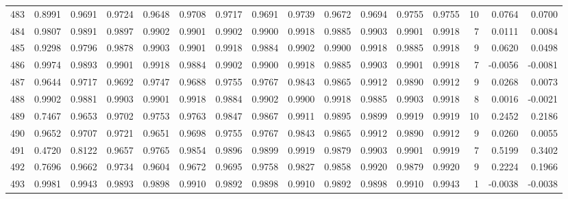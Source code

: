 \begin{tabular}{lrrrrrrrrrrrrrrr}
483 &      0.8991 &  0.9691 &  0.9724 &  0.9648 &  0.9708 &  0.9717 &  0.9691 &  0.9739 &  0.9672 &  0.9694 &   0.9755 &     0.9755 &     10 &                    0.0764 &                     0.0700 \\
484 &      0.9807 &  0.9891 &  0.9897 &  0.9902 &  0.9901 &  0.9902 &  0.9900 &  0.9918 &  0.9885 &  0.9903 &   0.9901 &     0.9918 &      7 &                    0.0111 &                     0.0084 \\
485 &      0.9298 &  0.9796 &  0.9878 &  0.9903 &  0.9901 &  0.9918 &  0.9884 &  0.9902 &  0.9900 &  0.9918 &   0.9885 &     0.9918 &      9 &                    0.0620 &                     0.0498 \\
486 &      0.9974 &  0.9893 &  0.9901 &  0.9918 &  0.9884 &  0.9902 &  0.9900 &  0.9918 &  0.9885 &  0.9903 &   0.9901 &     0.9918 &      7 &                   -0.0056 &                    -0.0081 \\
487 &      0.9644 &  0.9717 &  0.9692 &  0.9747 &  0.9688 &  0.9755 &  0.9767 &  0.9843 &  0.9865 &  0.9912 &   0.9890 &     0.9912 &      9 &                    0.0268 &                     0.0073 \\
488 &      0.9902 &  0.9881 &  0.9903 &  0.9901 &  0.9918 &  0.9884 &  0.9902 &  0.9900 &  0.9918 &  0.9885 &   0.9903 &     0.9918 &      8 &                    0.0016 &                    -0.0021 \\
489 &      0.7467 &  0.9653 &  0.9702 &  0.9753 &  0.9763 &  0.9847 &  0.9867 &  0.9911 &  0.9895 &  0.9899 &   0.9919 &     0.9919 &     10 &                    0.2452 &                     0.2186 \\
490 &      0.9652 &  0.9707 &  0.9721 &  0.9651 &  0.9698 &  0.9755 &  0.9767 &  0.9843 &  0.9865 &  0.9912 &   0.9890 &     0.9912 &      9 &                    0.0260 &                     0.0055 \\
491 &      0.4720 &  0.8122 &  0.9657 &  0.9765 &  0.9854 &  0.9896 &  0.9899 &  0.9919 &  0.9879 &  0.9903 &   0.9901 &     0.9919 &      7 &                    0.5199 &                     0.3402 \\
492 &      0.7696 &  0.9662 &  0.9734 &  0.9604 &  0.9672 &  0.9695 &  0.9758 &  0.9827 &  0.9858 &  0.9920 &   0.9879 &     0.9920 &      9 &                    0.2224 &                     0.1966 \\
493 &      0.9981 &  0.9943 &  0.9893 &  0.9898 &  0.9910 &  0.9892 &  0.9898 &  0.9910 &  0.9892 &  0.9898 &   0.9910 &     0.9943 &      1 &                   -0.0038 &                    -0.0038 \\

\end{tabular}
